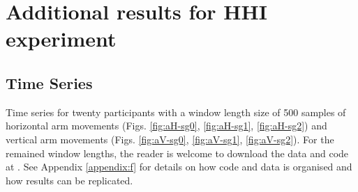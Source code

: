 \chapter{Additional results for HHI experiment} \label{appendix:e}

\graphicspath{{figs/appendixE/PDF/}}


\section{Time Series} \label{appendix:e:ts}

Time series for twenty participants with a window length size of 500 samples
of horizontal arm movements (Figs. \ref{fig:aH-sg0}, \ref{fig:aH-sg1}, \ref{fig:aH-sg2})
and vertical arm movements (Figs. \ref{fig:aV-sg0}, \ref{fig:aV-sg1}, \ref{fig:aV-sg2}).
For the remained window lengths, 
the reader is welcome to download the data and code at \cite{xochicale2018}.
See Appendix \ref{appendix:f}
for details on how code and data 
is organised and how results can be replicated. 



